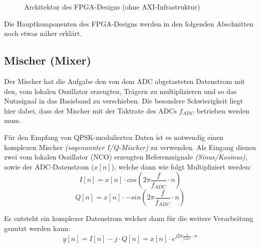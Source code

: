 \begin{figure}[h]
	\caption{Architektur des \acs{FPGA}-Designs (ohne \acs{AXI}-Infrastruktur)}
\end{figure}

Die Hauptkomponenten des \acs{FPGA}-Designs werden in den folgenden Abschnitten noch etwas näher erklärt.

\subsection{Mischer (Mixer)}
Der Mischer hat die Aufgabe den von dem \acs{ADC} abgetasteten Datenstrom mit den, vom lokalen Oszillator erzeugten, Trägern zu multiplizieren und so das Nutzsignal in das
Basisband zu verschieben. Die besondere Schwierigkeit liegt hier dabei, dass der Mischer mit der Taktrate des \acs{ADC}s $f_{ADC}$ betrieben werden muss.

Für den Empfang von \acs{QPSK}-modulierten Daten ist es notwendig einen komplexen Mischer \textit{(sogenannter I/Q-Mischer)} zu verwenden.
Als Eingang dienen zwei vom lokalen Oszillator (\acs{NCO}) erzeugten Referenzsignale \textit{(Sinus/Kosinus)}, sowie der \acs{ADC}-Datenstrom ($x[n]$),
welche dann wie folgt Multipliziert werden: 
\begin{equation}
	I[n] = x[n]\cdot cos(2\pi\frac{f}{f_{ADC}}\cdot n) 
\end{equation}
\begin{equation}
	Q[n] = x[n]\cdot -sin(2\pi\frac{f}{f_{ADC}}\cdot n) 
\end{equation}

Es entsteht ein komplexer Datenstrom welcher dann für die weitere Verarbeitung genutzt werden kann:
\begin{equation}
	\underline{y}[n] = I[n] - j \cdot Q[n] = x[n]\cdot e^{j2\pi\frac{f}{f_{ADC}}\cdot n}
\end{equation}

